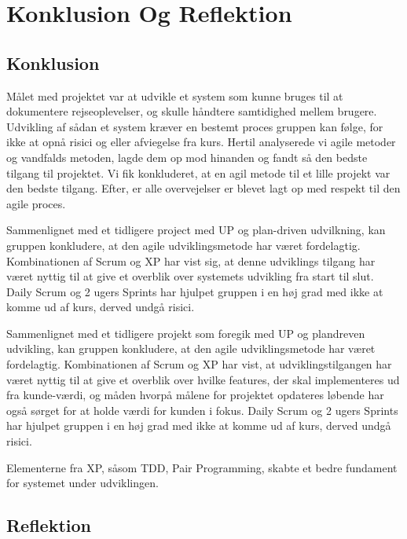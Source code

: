 \chapter{Konklusion Og Reflektion}\label{ch:KonklusionReflektion}

\section{Konklusion}
Målet med projektet var at udvikle et system som kunne bruges til at dokumentere rejseoplevelser, og skulle håndtere samtidighed mellem brugere. Udvikling af sådan et system kræver en bestemt proces gruppen kan følge, for ikke at opnå risici og eller afviegelse fra kurs. Hertil analyserede vi agile metoder og vandfalds metoden, lagde dem op mod hinanden og fandt så den bedste tilgang til projektet. Vi fik konkluderet, at en agil metode til et lille projekt var den bedste tilgang. Efter, er alle overvejelser er blevet lagt op med respekt til den agile proces. 

Sammenlignet med et tidligere project med UP og plan-driven udvilkning, kan gruppen konkludere, at den agile udviklingsmetode har været fordelagtig. Kombinationen af Scrum og XP har vist sig, at denne udviklings tilgang har været nyttig til at give et overblik over systemets udvikling fra start til slut. Daily Scrum og 2 ugers Sprints har hjulpet gruppen i en høj grad med ikke at komme ud af kurs, derved undgå risici. 

 


Sammenlignet med et tidligere projekt som foregik med UP og plandreven udvikling, kan gruppen konkludere, at den agile udviklingsmetode har været fordelagtig. Kombinationen af Scrum og XP har vist, at udviklingstilgangen har været nyttig til at give et overblik over hvilke features, der skal implementeres ud fra kunde-værdi, og måden hvorpå målene for projektet opdateres løbende har også sørget for at holde værdi for kunden i fokus. Daily Scrum og 2 ugers Sprints har hjulpet gruppen i en høj grad med ikke at komme ud af kurs, derved undgå risici. 

Elementerne fra XP, såsom TDD, Pair Programming, skabte et bedre fundament for systemet under udviklingen.
 
 


\section{Reflektion}
